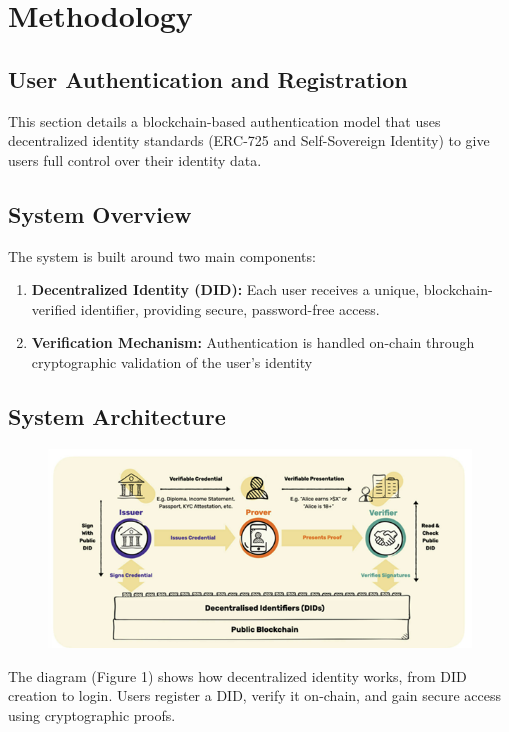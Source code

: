 \documentclass[preprint,12pt]{elsarticle}
\begin{document}
\section{Methodology}
\subsection{User Authentication and Registration}
This section details a blockchain-based authentication model that uses decentralized identity standards (ERC-725 and Self-Sovereign Identity) to give users full control over their identity data.
\subsection{System Overview}
The system is built around two main components:
\begin{enumerate}
    \item \textbf{Decentralized Identity (DID):} Each user receives a unique, blockchain-verified identifier, providing secure, password-free access.
    \item \textbf{Verification Mechanism:} Authentication is handled on-chain through cryptographic validation of the user’s identity
\end{enumerate}
\subsection{System Architecture}
\begin{figure}
    \centering
    \includegraphics[width=1\linewidth]{fig/fig1c.png}
    \caption{\citep{mediumurl}}
    \label{fig:fig1c}
\end{figure}
The diagram (Figure 1) shows how decentralized identity works, from DID creation to login. Users register a DID, verify it on-chain, and gain secure access using cryptographic proofs.
\end{document}
